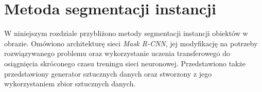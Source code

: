 \chapter{Metoda segmentacji instancji}
W niniejszym rozdziale przybliżono metody segmentacji instancji obiektów w obrazie.
Omówiono architekturę sieci \textit{Mask R-CNN}, jej modyfikację na potrzeby rozwiązywanego problemu oraz wykorzystanie uczenia transferowego do osiągnięcia skróconego czasu treningu sieci neuronowej.
Przedstawiono także przedstawiony generator sztucznych danych oraz stworzony z jego wykorzystaniem zbior sztucznych danych.
